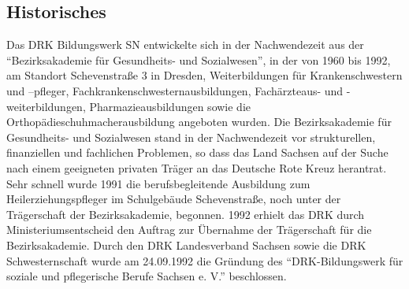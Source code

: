 \subsection{Historisches}
\label{sec:Historisches}

Das DRK Bildungswerk SN entwickelte sich in der Nachwendezeit aus der "`Bezirksakademie für Gesundheits- und Sozialwesen"', in der von 1960 bis 1992, am Standort Schevenstraße 3 in Dresden, Weiterbildungen für Krankenschwestern und –pfleger, Fachkrankenschwesternausbildungen, Fachärzteaus- und -weiterbildungen, Pharmazieausbildungen sowie die Orthopädieschuhmacherausbildung angeboten wurden. Die Bezirksakademie für Gesundheits- und Sozialwesen stand in der Nachwendezeit vor strukturellen, finanziellen und fachlichen Problemen, so dass das Land Sachsen auf der Suche nach einem geeigneten privaten Träger an das Deutsche Rote Kreuz herantrat. Sehr schnell wurde 1991 die berufsbegleitende Ausbildung zum Heilerziehungspfleger im Schulgebäude Schevenstraße, noch unter der Trägerschaft der Bezirksakademie, begonnen. 1992 erhielt das DRK durch Ministeriumsentscheid den Auftrag zur Übernahme der Trägerschaft für die Bezirksakademie. Durch den DRK Landesverband Sachsen sowie die DRK Schwesternschaft wurde am 24.09.1992 die Gründung des "`DRK-Bildungswerk für soziale und pflegerische Berufe Sachsen e. V."' beschlossen.  

